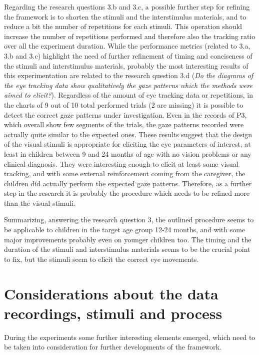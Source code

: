 Regarding the research questions 3.b and 3.c, a possible further step for refining the framework is to shorten the stimuli and the interstimulus materials, and to reduce a bit the number of repetitions for each stimuli. This operation should increase the number of repetitions performed and therefore also the tracking ratio over all the experiment duration.
While the performance metrics (related to 3.a, 3.b and 3.c) highlight the need of further refinement of timing and conciseness of the stimuli and interstimulus materials, probably the most interesting results of this experimentation are related to the research question 3.d (\textit{Do the diagrams of the eye tracking data show qualitatively the gaze patterns which the methods were aimed to elicit?}). Regardless of the amount of eye tracking data or repetitions, in the charts of 9 out of 10 total performed trials (2 are missing) it is possible to detect the correct gaze patterns under investigation. Even in the records of P3, which overall show few segments of the trials, the gaze patterns recorded were actually quite similar to the expected ones. These results suggest that the design of the visual stimuli is appropriate for eliciting the eye parameters of interest, at least in children between 9 and 24 months of age with no vision problems or any clinical diagnosis. They were interesting enough to elicit at least some visual tracking, and with some external reinforcement coming from the caregiver, the children did actually perform the expected gaze patterns. Therefore, as a further step in the research it is probably the procedure which needs to be refined more than the visual stimuli.

Summarizing, answering the research question 3, the outlined procedure seems to be applicable to children in the target age group 12-24 months, and with some major improvements probably even on younger children too. The timing and the duration of the stimuli and interstimulus materials seems to be the crucial point to fix, but the stimuli seem to elicit the correct eye movements.

\section{Considerations about the data recordings, stimuli and process }
\label{sec:discconsiderations}

During the experiments some further interesting elements emerged, which need to be taken into consideration for further developments of the framework.

